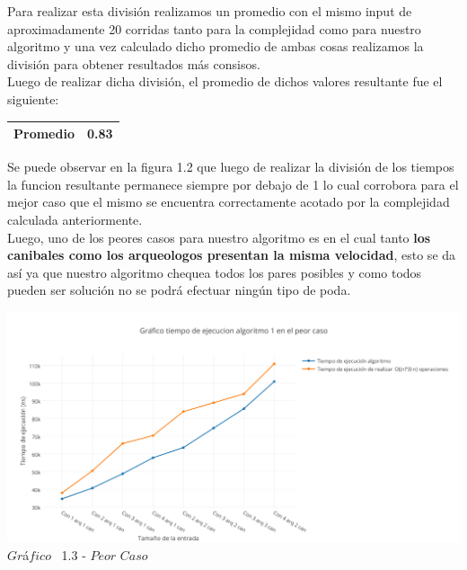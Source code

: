  Para realizar esta divisi\'on realizamos un promedio con el mismo input de aproximadamente 20 corridas tanto para la complejidad como para nuestro algoritmo y una vez calculado dicho promedio de ambas cosas realizamos la divisi\'on para
obtener resultados m\'as consisos.\\ 

Luego de realizar dicha divisi\'on, el promedio de dichos valores resultante fue el siguiente:

\begin{center}
\begin{table}[H]

    \begin{tabular}{ | l |l |}
    \hline

\textbf{Promedio} & 0.83 \\ \hline

    \end{tabular}
\end{table}
\end{center}


Se puede observar en la figura 1.2 que luego de realizar la divisi\'on de los tiempos la funcion resultante permanece siempre por debajo de 1 lo cual corrobora para el mejor caso que el mismo se encuentra correctamente acotado por la complejidad calculada anteriormente.\\

Luego, uno de los peores casos para nuestro algoritmo es en el cual tanto \textbf{los canibales como los arqueologos presentan la misma velocidad}, esto se da as\'i ya que nuestro algoritmo chequea todos los pares posibles y como todos pueden ser soluci\'on no se podr\'a efectuar ning\'un tipo de poda.\\


\vspace*{0.3cm} \vspace*{0.3cm}
  \begin{center}
\includegraphics[scale=0.6]{./EJ1/peorcasoej1.png}
{$Gr$\'a$fico$ \ 1.3 - $Peor$ $Caso$}
  \end{center}
  \vspace*{0.3cm}

